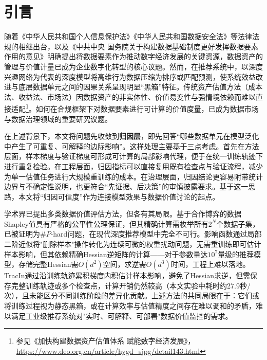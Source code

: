 
\chapter{引言}


\label{sec:intro}
随着《中华人民共和国个人信息保护法》《中华人民共和国数据安全法》等法律法规的相继出台，以及《中共中央 国务院关于构建数据基础制度更好发挥数据要素作用的意见》明确提出将数据要素作为推动数字经济发展的关键资源，数据资产的管理与价值计量已成为企业数字化转型的核心议题。然而，在推荐系统中，以深度兴趣网络\cite{zhou2018deep}为代表的深度模型将高维行为数据压缩为排序或匹配预测，使系统效益改进与底层数据单元之间的因果关系呈现明显“黑箱”特征。传统资产估值方法（成本法、收益法、市场法）因数据资产的非实体性、价值易变性与强情境依赖而难以直接适配\footnote{参见《加快构建数据资产估值体系 赋能数字经济发展》，\url{https://www.deo.org.cn/article/hygd_sjpg/detail143.html}}。如何在合规框架下对数据要素进行可计算的价值度量，已成为数据市场与数据治理领域的重要研究议题\cite{xu2023data}。

在上述背景下，本文将问题先收敛到\textbf{归因层}，即先回答“哪些数据单元在模型泛化中产生了可重复、可解释的边际影响”。这样处理主要基于三点考虑。首先在方法层面，样本梯度与验证梯度可形成可计算的局部影响代理，便于在统一训练轨迹下进行重复检验。在工程层面，归因指标可以直接复用既有检查点与验证流程，减少为单一估值任务进行大规模重训练的成本。在治理层面，归因结论更容易附带统计边界与不确定性说明，也更符合“先证据、后决策”的审慎披露要求。基于这一思路，本文将“归因可信度”作为连接模型效果与数据价值讨论的起点。

学术界已提出多类数据价值评估方法，但各有其局限。基于合作博弈的数据Shapley值\cite{ghorbani2019data}具有严格的公平性公理保证，但其精确计算需枚举所有$2^N$个数据子集，已被证明为$\#P$-hard问题\cite{andos2012computation}，在现代深度推荐模型中完全不可行。影响函数\cite{influence}通过局部二阶近似将"删除样本"操作转化为连续可微的权重扰动问题，无需重训练即可估计样本影响，但其依赖精确Hessian逆矩阵的计算——对于参数量达$10^7$量级的推荐模型，存储完整Hessian需$O(d^2)$空间，求逆需$O(d^3)$时间，工程上难以落地。TracIn\cite{TracIn}通过沿训练轨迹累积梯度内积估计样本影响，避免了Hessian求逆，但需保存完整训练轨迹或多个检查点，计算开销仍然较高（本文实验中耗时约27.9秒/次），且未能区分不同训练阶段的差异化贡献。上述方法的共同局限在于：它们或将训练过程视为静态黑箱，或在计算效率与估值精度之间存在难以调和的矛盾，难以满足工业级推荐系统对"实时、可解释、可部署"数据价值监控的需求。



